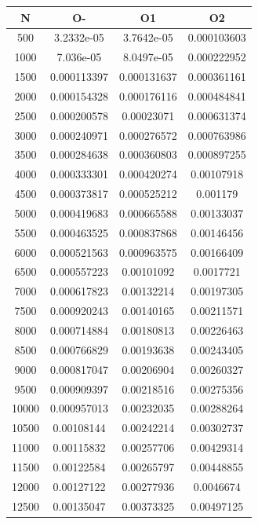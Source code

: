 \begin{center}
\begin{tabular}{| c | c | c | c |}
\hline
\textbf{N} & \textbf{O-} & \textbf{O1} & \textbf{O2} \\ \hline
500 & 3.2332e-05 & 3.7642e-05 & 0.000103603 \\ \hline
1000 & 7.036e-05 & 8.0497e-05 & 0.000222952 \\ \hline
1500 & 0.000113397 & 0.000131637 & 0.000361161 \\ \hline
2000 & 0.000154328 & 0.000176116 & 0.000484841 \\ \hline
2500 & 0.000200578 & 0.00023071 & 0.000631374 \\ \hline
3000 & 0.000240971 & 0.000276572 & 0.000763986 \\ \hline
3500 & 0.000284638 & 0.000360803 & 0.000897255 \\ \hline
4000 & 0.000333301 & 0.000420274 & 0.00107918 \\ \hline
4500 & 0.000373817 & 0.000525212 & 0.001179 \\ \hline
5000 & 0.000419683 & 0.000665588 & 0.00133037 \\ \hline
5500 & 0.000463525 & 0.000837868 & 0.00146456 \\ \hline
6000 & 0.000521563 & 0.000963575 & 0.00166409 \\ \hline
6500 & 0.000557223 & 0.00101092 & 0.0017721 \\ \hline
7000 & 0.000617823 & 0.00132214 & 0.00197305 \\ \hline
7500 & 0.000920243 & 0.00140165 & 0.00211571 \\ \hline
8000 & 0.000714884 & 0.00180813 & 0.00226463 \\ \hline
8500 & 0.000766829 & 0.00193638 & 0.00243405 \\ \hline
9000 & 0.000817047 & 0.00206904 & 0.00260327 \\ \hline
9500 & 0.000909397 & 0.00218516 & 0.00275356 \\ \hline
10000 & 0.000957013 & 0.00232035 & 0.00288264 \\ \hline
10500 & 0.00108144 & 0.00242214 & 0.00302737 \\ \hline
11000 & 0.00115832 & 0.00257706 & 0.00429314 \\ \hline
11500 & 0.00122584 & 0.00265797 & 0.00448855 \\ \hline
12000 & 0.00127122 & 0.00277936 & 0.0046674 \\ \hline
12500 & 0.00135047 & 0.00373325 & 0.00497125 \\ \hline
\hline
\end{tabular}
\end{center}
